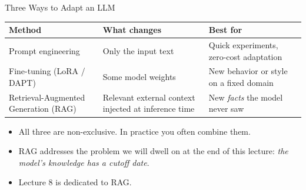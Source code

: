 \begin{frame}{Three Ways to Adapt an LLM}
\begin{center}
\renewcommand{\arraystretch}{1.35}
\begin{tabular}{p{3.2cm} p{4.2cm} p{4.5cm}}
\toprule
\textbf{Method} & \textbf{What changes} & \textbf{Best for} \\
\midrule
Prompt engineering & Only the input text & Quick experiments, zero-cost adaptation \\
Fine-tuning (LoRA / DAPT) & Some model weights & New behavior or style on a fixed domain \\
Retrieval-Augmented Generation (RAG) & Relevant external context injected at inference time & New \emph{facts} the model never saw \\
\bottomrule
\end{tabular}
\end{center}

\medskip
\begin{itemize}
\item All three are non-exclusive. In practice you often combine them.
\item RAG addresses the problem we will dwell on at the end of this lecture: \emph{the model's knowledge has a cutoff date}.
\item Lecture 8 is dedicated to RAG.
\end{itemize}
\end{frame}

